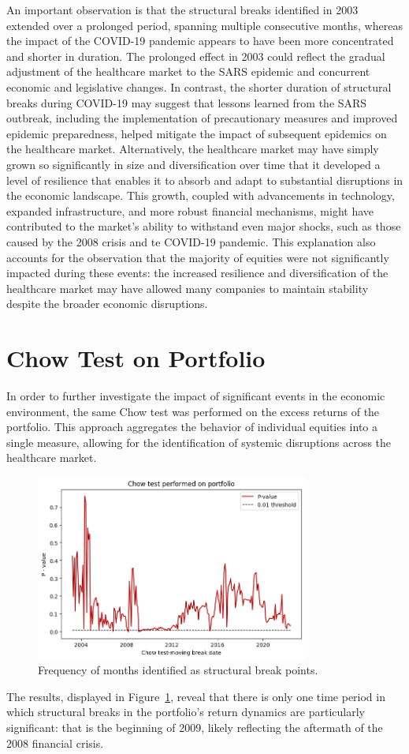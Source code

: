 An important observation is that the structural breaks identified in 2003 extended over a prolonged period, spanning multiple
consecutive months, whereas the impact of the COVID-19 pandemic appears to have been more concentrated and shorter in duration.
The prolonged effect in 2003 could reflect the gradual adjustment of the healthcare market to the SARS epidemic and concurrent
economic and legislative changes.
In contrast, the shorter duration of structural breaks during COVID-19 may suggest that lessons learned from the SARS outbreak,
including the implementation of precautionary measures and improved epidemic preparedness, helped mitigate the impact of
subsequent epidemics on the healthcare market.
Alternatively, the healthcare market may have simply grown so significantly in size and diversification over time that it 
developed a level of resilience that enables it to absorb and adapt to substantial disruptions in the economic landscape.
This growth, coupled with advancements in technology, expanded infrastructure, and more robust financial mechanisms,
might have contributed to the market's ability to withstand even major shocks, such as those caused by the 2008 crisis and
te COVID-19 pandemic.
This explanation also accounts for the observation that the majority of equities were not significantly impacted during these
events: the increased resilience and diversification of the healthcare market may have allowed many companies to maintain
stability despite the broader economic disruptions.

\section{Chow Test on Portfolio}

In order to further investigate the impact of significant events in the economic environment, the same Chow test was 
performed on the excess returns of the portfolio. 
This approach aggregates the behavior of individual equities into a single measure, allowing for the identification of 
systemic disruptions across the healthcare market.

\begin{figure}[h!]
    \centering
    \includegraphics[width=0.8\textwidth]{images/portchowlio.png}
    \caption{Frequency of months identified as structural break points.}\label{fig:portchowlio}
\end{figure}

The results, displayed in Figure~\ref{fig:portchowlio}, reveal that there is only one time period in which structural breaks 
in the portfolio's return dynamics are particularly significant: that is the beginning of 2009, likely reflecting the
aftermath of the 2008 financial crisis.
